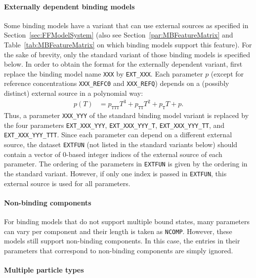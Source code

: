 \paragraph{Externally dependent binding models}

Some binding models have a variant that can use external sources as specified in Section~\ref{sec:FFModelSystem} (also see Section~\ref{par:MBFeatureMatrix} and Table~\ref{tab:MBFeatureMatrix} on which binding models support this feature).
For the sake of brevity, only the standard variant of those binding models is specified below.
In order to obtain the format for the externally dependent variant, first replace the binding model name \texttt{XXX} by \texttt{EXT\_XXX}.
Each parameter $p$ (except for reference concentrations \texttt{XXX\_REFC0} and \texttt{XXX\_REFQ}) depends on a (possibly distinct) external source in a polynomial way:
\begin{align*}
  p(T) &= p_{\texttt{TTT}} T^3 + p_{\texttt{TT}} T^2 + p_{\texttt{T}} T + p.
\end{align*}
Thus, a parameter \texttt{XXX\_YYY} of the standard binding model variant is replaced by the four parameters \texttt{EXT\_XXX\_YYY}, \texttt{EXT\_XXX\_YYY\_T}, \texttt{EXT\_XXX\_YYY\_TT}, and \texttt{EXT\_XXX\_YYY\_TTT}.
Since each parameter can depend on a different external source, the dataset \texttt{EXTFUN} (not listed in the standard variants below) should contain a vector of 0-based integer indices of the external source of each parameter.
The ordering of the parameters in \texttt{EXTFUN} is given by the ordering in the standard variant.
However, if only one index is passed in \texttt{EXTFUN}, this external source is used for all parameters.

\paragraph{Non-binding components}

For binding models that do not support multiple bound states, many parameters can vary per component and their length is taken as \texttt{NCOMP}.
However, these models still support non-binding components.
In this case, the entries in their parameters that correspond to non-binding components are simply ignored.

\paragraph{Multiple particle types}

